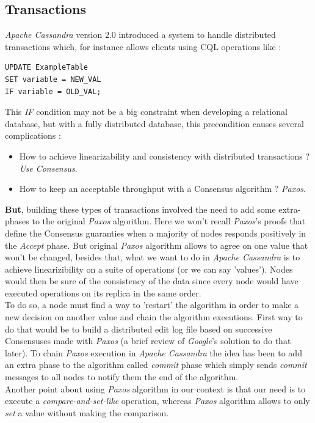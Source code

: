 \documentclass[a4paper]{report}
\newcommand{\ca}{\emph{Apache Cassandra\xspace}}
\newcommand{\px}{\emph{Paxos\xspace}}
\begin{document}
\subsection{Transactions}
\ca{} version 2.0 introduced a system to handle distributed transactions which, for instance allows clients using CQL operations like :
\vspace{0.7cm}
\begin{lstlisting}[label=cql-ex-1, caption=CQL Update Example, style=CQL]
UPDATE ExampleTable
SET variable = NEW_VAL
IF variable = OLD_VAL;
\end{lstlisting}
\vspace{0.7cm}
This \emph{IF} condition may not be a big constraint when developing a relational database, but with a fully distributed database, this precondition causes several complications : 
\begin{itemize}
	\item How to achieve linearizability and consistency with distributed transactions ? \emph{Use Consensus}.
	\item How to keep an acceptable throughput with a Consensus algorithm ? \px{}\cite{Lamport1}.
\end{itemize}
{\bfseries But}, building these types of transactions involved the need to add some extra-phases to the original \px{} algorithm. Here we won't recall \px{}'s proofs that define the Consensus guaranties when a majority of nodes responds positively in the \emph{Accept} phase. But original \px{} algorithm allows to agree on one value that won't be changed, besides that, what we want to do in \ca{} is to achieve linearizibility on a suite of operations (or we can say 'values'). Nodes would then be sure of the consistency of the data since every node would have executed operations on its replica in the same order. \\
To do so, a node must find a way to 'restart' the algorithm in order to make a new decision on another value and chain the algorithm executions. First way to do that would be to build a distributed edit log file based on successive Consensuses made with \px{} (a brief review of \emph{Google}'s solution to do that later). To chain \px{} execution in \ca{} the idea has been to add an extra phase to the algorithm called \emph{commit} phase which simply sends \emph{commit} messages to all nodes to notify them the end of the algorithm.\\
Another point about using \px{} algorithm in our context is that our need is to execute a \emph{compare-and-set-like} operation, whereas \px{} algorithm allows to only \emph{set} a value without making the comparison. \\
\end{document}

